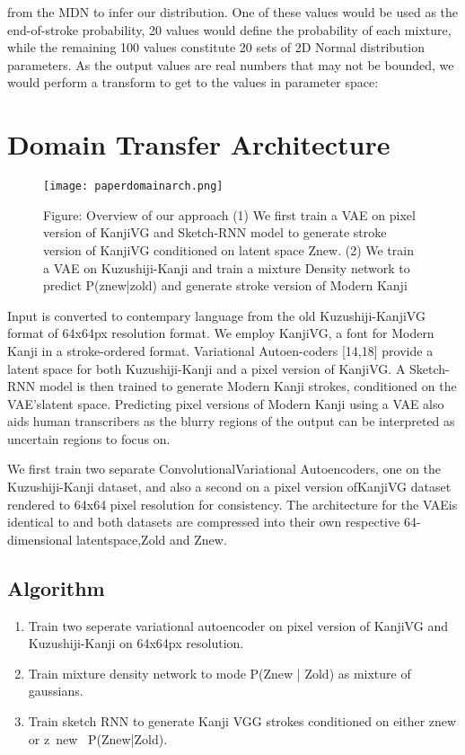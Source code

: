 \documentclass[12pt]{report}
\begin{document}
from the MDN to infer our distribution. One of these values would be
used as the end-of-stroke probability, 20 values would define the
probability of each mixture, while the remaining 100 values constitute
20 sets of 2D Normal distribution parameters. As the output values are
real numbers that may not be bounded, we would perform a transform to
get to the values in parameter space:



\section{Domain Transfer Architecture}
\begin{figure}[h]
\centering
\texttt{[image: paperdomainarch.png]}
\caption{Figure: Overview of our approach (1) We first train a VAE on
pixel version of KanjiVG and Sketch-RNN model to generate stroke
version of KanjiVG conditioned on latent space Znew. (2) We train a
VAE on Kuzushiji-Kanji and train a mixture Density network to predict
P(znew|zold) and generate stroke version of Modern Kanji}
\end{figure}

Input is converted to contempary language from the old
Kuzushiji-KanjiVG format of 64x64px resolution format.
We employ KanjiVG, a font for Modern Kanji in a stroke-ordered format.
Variational Autoen-coders [14,18] provide a latent space for both
Kuzushiji-Kanji and a pixel version of KanjiVG. A Sketch-RNN  model is
then trained to generate Modern Kanji strokes, conditioned on the
VAE’slatent space. Predicting pixel versions of Modern Kanji using a
VAE also aids human transcribers as the blurry regions of the output
can be interpreted as uncertain regions to focus on.

We first train two separate ConvolutionalVariational Autoencoders, one
on the Kuzushiji-Kanji dataset, and also a second on a pixel version
ofKanjiVG dataset rendered to 64x64 pixel resolution for consistency.
The architecture for the VAEis identical to  and both datasets are
compressed into their own respective 64-dimensional latentspace,Zold
and Znew.



\subsection{Algorithm}
\begin{enumerate}
  \item Train two seperate variational autoencoder on pixel version of
KanjiVG and Kuzushiji-Kanji on 64x64px resolution.
  \item Train mixture density network to mode P(Znew | Zold) as
mixture of gaussians.
  \item Train sketch RNN to generate Kanji VGG strokes conditioned on
either znew or z~new ~P(Znew|Zold).
\end{enumerate}
\end{document}
